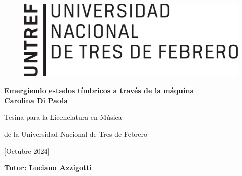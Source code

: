 \begin{titlepage}


\begin{figure} [h!]
 	\begin{flushright}
 		\includegraphics[scale=0.40]{logo_untref}
 	\end{flushright}
\end{figure}

 	\begin{center}

 		\vspace{1cm}
		{\LARGE \textbf {Emergiendo estados tímbricos a través de la máquina}}\\
		\vspace{2cm}
		{\large \textbf {Carolina Di Paola}}
		
		\vspace{11cm}
		
		{\Large Tesina para la Licenciatura en Música}
		
		{\Large de la Universidad Nacional de Tres de Febrero}
		
 		{\Large [Octubre 2024]}
 				\vspace{1cm}
 		
 		{\Large \textbf{Tutor: Luciano Azzigotti}}
	\end{center}
\end{titlepage}
 